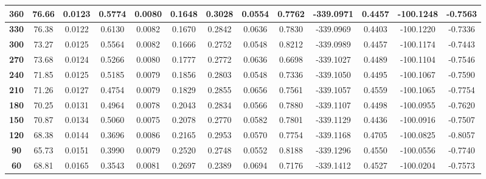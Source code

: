 \begin{landscape}
\begin{table}[h]
\begin{tabular}{|c|c|c|c|c|c|c|c|c|c|c|c|c|}
\textbf{360}    & 76.66         & 0.0123         & 0.5774       & 0.0080         & 0.1648          & 0.3028        & 0.0554      & 0.7762      & -339.0971  & 0.4457      & -100.1248  & -0.7563     \\ \hline
\textbf{330}    & 76.38         & 0.0122         & 0.6130       & 0.0082         & 0.1670          & 0.2842        & 0.0636      & 0.7830      & -339.0969  & 0.4403      & -100.1220  & -0.7336     \\ \hline
\textbf{300}    & 73.27         & 0.0125         & 0.5564       & 0.0082         & 0.1666          & 0.2752        & 0.0548      & 0.8212      & -339.0989  & 0.4457      & -100.1174  & -0.7443     \\ \hline
\textbf{270}    & 73.68         & 0.0124         & 0.5266       & 0.0080         & 0.1777          & 0.2772        & 0.0636      & 0.6698      & -339.1027  & 0.4489      & -100.1104  & -0.7546     \\ \hline
\textbf{240}    & 71.85         & 0.0125         & 0.5185       & 0.0079         & 0.1856          & 0.2803        & 0.0548      & 0.7336      & -339.1050  & 0.4495      & -100.1067  & -0.7590     \\ \hline
\textbf{210}    & 71.26         & 0.0127         & 0.4754       & 0.0079         & 0.1829          & 0.2855        & 0.0656      & 0.7561      & -339.1057  & 0.4559      & -100.1065  & -0.7754     \\ \hline
\textbf{180}    & 70.25         & 0.0131         & 0.4964       & 0.0078         & 0.2043          & 0.2834        & 0.0566      & 0.7880      & -339.1107  & 0.4498      & -100.0955  & -0.7620     \\ \hline
\textbf{150}    & 70.87         & 0.0134         & 0.5060       & 0.0075         & 0.2078          & 0.2770        & 0.0582      & 0.7801      & -339.1129  & 0.4436      & -100.0916  & -0.7507     \\ \hline
\textbf{120}    & 68.38         & 0.0144         & 0.3696       & 0.0086         & 0.2165          & 0.2953        & 0.0570      & 0.7754      & -339.1168  & 0.4705      & -100.0825  & -0.8057     \\ \hline
\textbf{90}     & 65.73         & 0.0151         & 0.3990       & 0.0079         & 0.2520          & 0.2748        & 0.0552      & 0.8188      & -339.1296  & 0.4550      & -100.0556  & -0.7740     \\ \hline
\textbf{60}     & 68.81         & 0.0165         & 0.3543       & 0.0081         & 0.2697          & 0.2389        & 0.0694      & 0.7176      & -339.1412  & 0.4527      & -100.0204  & -0.7573     \\ \hline
\end{tabular}
\end{table}\label{lengthofdatacompare}
\end{landscape}




